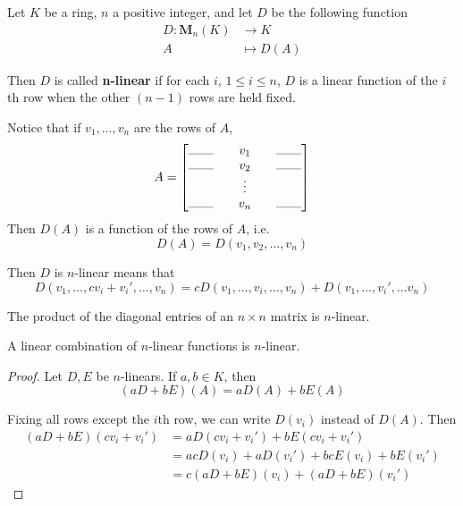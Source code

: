 \begin{definition}[$n$-linear]
	Let $K$ be a ring, $n$ a positive integer, and let $D$ be the following function
	\begin{equation*}
		\begin{aligned}
			D : \textbf{M}_n(K) &\longrightarrow K \\
			A &\longmapsto D(A)
		\end{aligned}
	\end{equation*}
	
	Then $D$ is called \textbf{n-linear} if for each $i$, $1 \leq i \leq n$, $D$ is a linear function of the $i$th row when the other $(n-1)$ rows are held fixed.
\end{definition}

Notice that if $v_1, \ldots, v_n$ are the rows of $A$,
\[
	A = \begin{bmatrix}
		\rule{0.7cm}{0.01cm} && v_1 && \rule{0.7cm}{0.01cm} \\
		\rule{0.7cm}{0.01cm} && v_2 && \rule{0.7cm}{0.01cm} \\
		&& \vdots && \\
		\rule{0.7cm}{0.01cm} && v_n && \rule{0.7cm}{0.01cm} \\
	\end{bmatrix}
\]	
Then $D(A)$ is a function of the rows of $A$, i.e.
\[
	D(A) = D(v_1, v_2, \ldots, v_n)
\]

Then $D$ is $n$-linear means that
\[
	D(v_1, \ldots, cv_i + v_i', \ldots, v_n) = cD(v_1, \ldots, v_i, \ldots, v_n) + D(v_1, \ldots, v_i', \ldots v_n)
\]

\begin{example}
	The product of the diagonal entries of an $n \times n$ matrix is $n$-linear.
\end{example}

\begin{lemma}
	A linear combination of $n$-linear functions is $n$-linear.
\end{lemma}

\begin{proof}
	Let $D, E$ be $n$-linears. If $a, b \in K$, then 
	\[
		(aD + bE)(A) = aD(A) + bE(A)
	\]

	Fixing all rows except the $i$th row, we can write $D(v_i)$ instead of $D(A)$. Then 
	\begin{equation*}
		\begin{aligned}
			(aD + bE)(cv_i + v_i') &= aD(cv_i + v_i') + bE(cv_i + v_i') \\
								   &= acD(v_i) + aD(v_i') + bcE(v_i) + bE(v_i') \\
								   &= c(aD + bE)(v_i) + (aD+bE)(v_i')
		\end{aligned}
	\end{equation*}
\end{proof}

